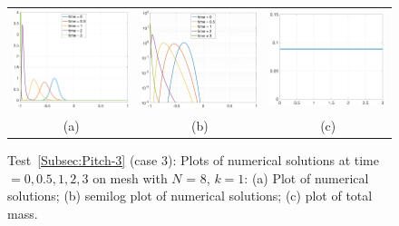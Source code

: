 \documentclass[preprint,11pt]{elsarticle}
\begin{document}
\begin{figure}[H]
\centering
\begin{tabular}{ccc}
\includegraphics[width=.3\textwidth]{./NumFig/Test4-3-2-L8D2}
&\includegraphics[width=.3\textwidth]{./NumFig/Test4-3-2-L8D2-log}
&\includegraphics[width=.3\textwidth]{./NumFig/Test4-3-k1-2-Con_v2}
\\
(a) & (b) &(c)
\end{tabular}
\caption{Test~\ref{Subsec:Pitch-3} (case 3): Plots of numerical solutions at time $=0,0.5,1,2,3$ on mesh with $N$ = 8, $k=1$: (a) Plot of numerical solutions; (b) semilog plot of numerical solutions; (c) plot of total mass.}\label{Fig:Pitch-3-3}
\end{figure}
\end{document}
